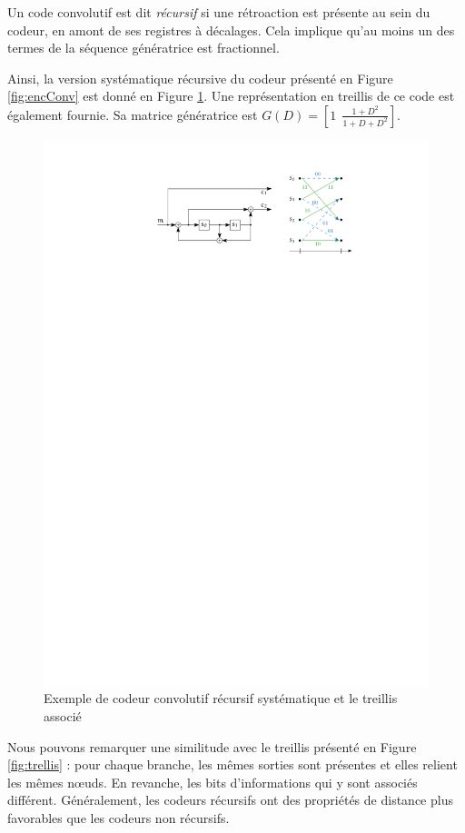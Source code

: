 Un code convolutif est dit \emph{récursif} si une rétroaction est présente au sein du codeur, en amont de ses registres à décalages. Cela 
implique qu'au moins un des termes de la séquence génératrice est fractionnel. 

Ainsi, la version systématique récursive du codeur présenté en Figure \ref{fig:encConv} est donné en Figure 
\ref{fig:encRSC}. Une représentation en treillis de ce code est également fournie. Sa matrice génératrice est $G(D) = \left[ 1 ~~\frac{1+D^2}{1+D+D^2} \right]$. 
\begin{figure}[!h]
	\centering
	\includegraphics[width=12cm]{main/ch1_fig/encRSC.pdf}
	\caption{\label{fig:encRSC} Exemple de codeur convolutif récursif systématique et le treillis associé}
\end{figure}
Nous pouvons remarquer une similitude avec le treillis présenté en Figure \ref{fig:trellis} : pour chaque branche,
les mêmes sorties sont présentes et elles relient les mêmes nœuds. En revanche, les bits d'informations qui y sont 
associés différent. Généralement, les codeurs récursifs ont des propriétés de distance plus favorables que les codeurs
non récursifs.

